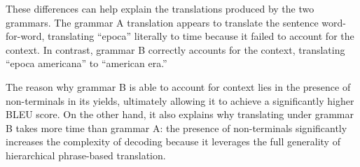 \documentclass[a4paper,oneside,reqno]{amsart}
\begin{document}
\begin{enumerate}[label=\arabic*.]
    These differences can help explain the translations produced by the two
    grammars.  The grammar A translation appears to translate the sentence
    word-for-word, translating ``epoca'' literally to time because it failed
    to account for the context. In contrast, grammar B correctly accounts for
    the context, translating ``epoca americana'' to ``american era.''

    The reason why grammar B is able to account for context lies in the
    presence of non-terminals in its yields, ultimately allowing it to achieve
    a significantly higher BLEU score. On the other hand, it also explains why
    translating under grammar B takes more time than grammar A: the presence of
    non-terminals significantly increases the complexity of decoding because it
    leverages the full generality of hierarchical phrase-based translation.


\end{enumerate}
\end{document}
